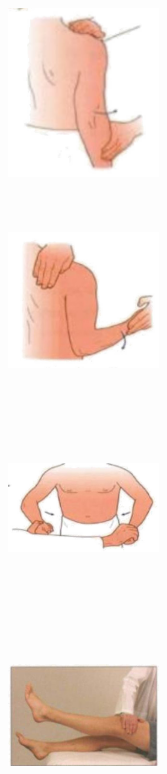\documentclass[a4paper,12pt,openany,oneside]{book}
\begin{document}
{\begin{figure}[H]
		\begin{subfigure}[t]{.25\textwidth}
			\includegraphics[width=4cm,height=5cm]{./clinicalPhysioPic/motorSystem/supraspinatus.jpg}
		\end{subfigure}
		\hspace{\fill}
		\begin{subfigure}[t]{.25\textwidth}
			\includegraphics[width=4cm,height=5cm]{./clinicalPhysioPic/motorSystem/infraspinatus.jpg}
		\end{subfigure}
		\hspace{\fill}
		\begin{subfigure}[t]{.25\textwidth}
			\includegraphics[width=4cm,height=5cm]{./clinicalPhysioPic/motorSystem/pectoralisMajor.jpg}
		\end{subfigure}
		\hspace{\fill}
		\begin{subfigure}[t]{.25\textwidth}
			\includegraphics[width=4cm,height=5cm]{./clinicalPhysioPic/motorSystem/hipFlexion.jpg}

\end{subfigure}
\end{figure}}
\end{document}
